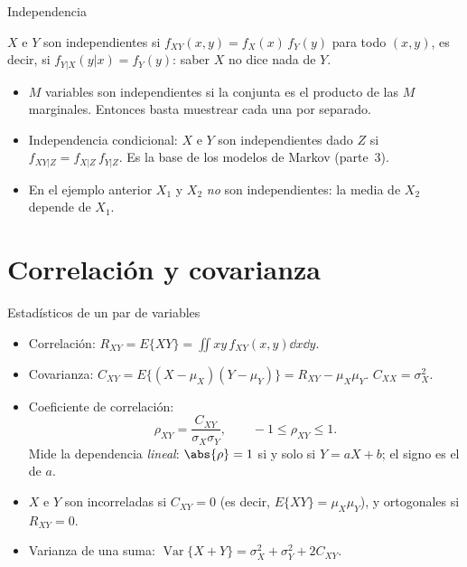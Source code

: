 \documentclass[aspectratio=169,11pt]{beamer}
\begin{document}
\begin{frame}{Independencia}
  \begin{definicion}
    $X$ e $Y$ son independientes si $f_{XY}(x,y)=f_X(x)\,f_Y(y)$ para todo $(x,y)$, es decir, si $f_{Y|X}(y|x)=f_Y(y)$: saber $X$ no dice nada de $Y$.
  \end{definicion}
  \small
  \begin{itemize}
    \item $M$ variables son independientes si la conjunta es el producto de las $M$ marginales. Entonces basta muestrear cada una por separado.
    \item \alert{Independencia condicional}: $X$ e $Y$ son independientes dado $Z$ si $f_{XY|Z}=f_{X|Z}\,f_{Y|Z}$. Es la base de los modelos de Markov (parte~3).
    \item En el ejemplo anterior $X_1$ y $X_2$ \emph{no} son independientes: la media de $X_2$ depende de $X_1$.
  \end{itemize}
\end{frame}

\section{Correlación y covarianza}

\begin{frame}{Estadísticos de un par de variables}
  \small
  \begin{itemize}
    \item \alert{Correlación}: $R_{XY}=E\{XY\}=\iint xy\,f_{XY}(x,y)\dd x\dd y$.
    \item \alert{Covarianza}: $C_{XY}=E\{(X-\mu_X)(Y-\mu_Y)\}=R_{XY}-\mu_X\mu_Y$. $C_{XX}=\sigma_X^2$.
    \item \alert{Coeficiente de correlación}:
    \[
      \rho_{XY}=\frac{C_{XY}}{\sigma_X\sigma_Y},\qquad-1\le\rho_{XY}\le1 .
    \]
    Mide la dependencia \emph{lineal}: $\abs{\rho}=1$ si y solo si $Y=aX+b$; el signo es el de $a$.
    \item $X$ e $Y$ son \alert{incorreladas} si $C_{XY}=0$ (es decir, $E\{XY\}=\mu_X\mu_Y$), y \alert{ortogonales} si $R_{XY}=0$.
    \item Varianza de una suma: $\operatorname{Var}\{X+Y\}=\sigma_X^2+\sigma_Y^2+2C_{XY}$.
  \end{itemize}
\end{frame}
\end{document}
